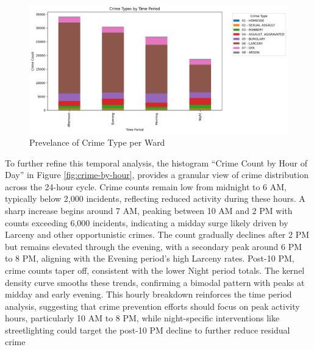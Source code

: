 \documentclass{report}
\begin{document}
\newpage
\begin{figure}[h]
  \begin{center}
    \advance\leftskip-3cm
    \advance\rightskip-3cm
    \includegraphics[keepaspectratio=true,scale=.6]{crime-types-by-time}
    \caption{Prevelance of Crime Type per Ward}
    \label{fig:crime-type-by-time}
  \end{center}
\end{figure}


\par To further refine this temporal analysis, the histogram “Crime Count by Hour of Day” in Figure \ref{fig:crime-by-hour}, provides a granular view of crime distribution across the 24-hour cycle. Crime counts remain low from midnight to 6 AM, typically below 2,000 incidents, reflecting reduced activity during these hours. A sharp increase begins around 7 AM, peaking between 10 AM and 2 PM with counts exceeding 6,000 incidents, indicating a midday surge likely driven by Larceny and other opportunistic crimes. The count gradually declines after 2 PM but remains elevated through the evening, with a secondary peak around 6 PM to 8 PM, aligning with the Evening period’s high Larceny rates. Post-10 PM, crime counts taper off, consistent with the lower Night period totals. The kernel density curve smooths these trends, confirming a bimodal pattern with peaks at midday and early evening. This hourly breakdown reinforces the time period analysis, suggesting that crime prevention efforts should focus on peak activity hours, particularly 10 AM to 8 PM, while night-specific interventions like streetlighting could target the post-10 PM decline to further reduce residual crime
\end{document}

